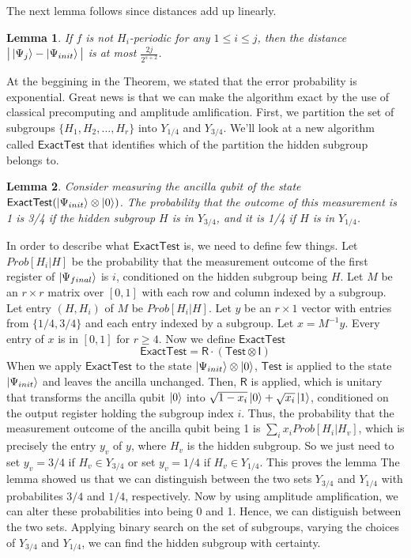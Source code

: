 \documentclass[12pt]{article}
\theoremstyle{plain}
\newtheorem{lem}{Lemma}
\theoremstyle{definition}
\begin{document}
\noindent The next lemma follows since distances add up linearly.
\begin{lem}
If $f$ is not $H_i$-periodic for any $1\leq i \leq j$, then the distance $\big|\left\vert{\Psi_j}\right\rangle-\left\vert{\Psi_{init}}\right\rangle\big|$ is at most $\frac{2j}{2^{s+2}}$.
\end{lem}
\noindent At the beggining in the Theorem, we stated that the error probability is exponential. Great news is that we can make the algorithm exact by the use of classical precomputing and amplitude amlification.
\newline
First, we partition the set of subgroups $\{H_1,H_2,\ldots,H_r\}$ into $Y_{1/4}$ and $Y_{3/4}$. We'll look at a new algorithm called $\mathsf{ExactTest}$ that identifies which of the partition the hidden subgroup belongs to.
\begin{lem}
Consider measuring the ancilla qubit of the state $\mathsf{ExactTest}(\left\vert{\Psi_{init}}\right\rangle\otimes\left\vert{0}\right\rangle)$. The probability that the outcome of this measurement is 1 is 3/4 if the hidden subgroup $H$ is in $Y_{3/4}$, and it is 1/4 if $H$ is in $Y_{1/4}$.
\end{lem}
\noindent In order to describe what $\mathsf{ExactTest}$ is, we need to define few things. Let $Prob[H_i|H]$ be the probability that the measurement outcome of the first register of $\left\vert{\Psi_{final}}\right\rangle$ is $i$, conditioned on the hidden subgroup being $H$. Let $M$ be an $r\times r$ matrix over $[0,1]$ with each row and column indexed by a subgroup. Let entry $(H,H_i)$ of $M$ be $Prob[H_i|H]$. Let $y$ be an $r\times 1$ vector with entries from $\{1/4,3/4\}$ and each entry indexed by a subgroup. Let $x=M^{-1}y$. Every entry of $x$ is in $[0,1]$ for $r\geq 4$.
\newline
Now we define $\mathsf{ExactTest}$
$$\mathsf{ExactTest}=\mathsf{R}\cdot(\mathsf{Test}\otimes\mathsf{I})$$
When we apply $\mathsf{ExactTest}$ to the state $\left\vert{\Psi_{init}}\right\rangle\otimes\left\vert{0}\right\rangle$, $\mathsf{Test}$ is applied to the state $\left\vert{\Psi_{init}}\right\rangle$ and leaves the ancilla unchanged. Then, $\mathsf{R}$ is applied, which is unitary that transforms the ancilla qubit $\left\vert{0}\right\rangle$ into $\sqrt{1-x_i}\left\vert{0}\right\rangle+\sqrt{x_i}\left\vert{1}\right\rangle$, conditioned on the output register holding the subgroup index $i$. Thus, the probability that the measurement outcome of the ancilla qubit being 1 is $\sum_{i}x_i Prob[H_i|H_v]$, which is precisely the entry $y_v$ of $y$, where $H_v$ is the hidden subgroup. So we just need to set $y_v=3/4$ if $H_v\in Y_{3/4}$ or set $y_v=1/4$ if $H_v\in Y_{1/4}$. This proves the lemma
\newline
The lemma showed us that we can distinguish between the two sets $Y_{3/4}$ and $Y_{1/4}$ with probabilites $3/4$ and $1/4$, respectively. Now by using amplitude amplification, we can alter these probabilities into being 0 and 1. Hence, we can distiguish between the two sets. Applying binary search on the set of subgroups, varying the choices of $Y_{3/4}$ and $Y_{1/4}$, we can find the hidden subgroup with certainty.
\end{document}
